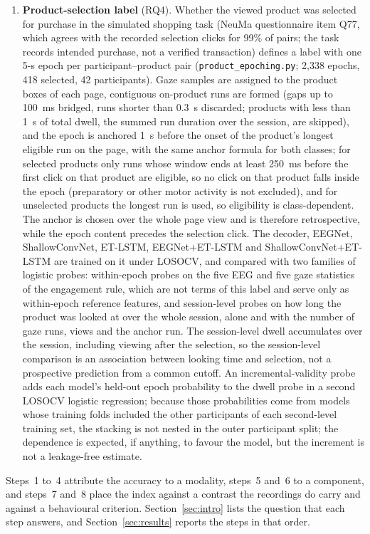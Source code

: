 \begin{enumerate}
\item \textbf{Product-selection label} (RQ4). Whether the viewed product was selected for purchase in the simulated shopping task (NeuMa questionnaire item Q77, which agrees with the recorded selection clicks for 99\% of pairs; the task records intended purchase, not a verified transaction) defines a label with one 5-s epoch per participant--product pair (\texttt{product\_epoching.py}; 2{,}338 epochs, 418 selected, 42 participants). Gaze samples are assigned to the product boxes of each page, contiguous on-product runs are formed (gaps up to 100~ms bridged, runs shorter than 0.3~s discarded; products with less than 1~s of total dwell, the summed run duration over the session, are skipped), and the epoch is anchored 1~s before the onset of the product's longest eligible run on the page, with the same anchor formula for both classes; for selected products only runs whose window ends at least 250~ms before the first click on that product are eligible, so no click on that product falls inside the epoch (preparatory or other motor activity is not excluded), and for unselected products the longest run is used, so eligibility is class-dependent. The anchor is chosen over the whole page view and is therefore retrospective, while the epoch content precedes the selection click. The decoder, EEGNet, ShallowConvNet, ET-LSTM, EEGNet+ET-LSTM and ShallowConvNet+ET-LSTM are trained on it under LOSOCV, and compared with two families of logistic probes: within-epoch probes on the five EEG and five gaze statistics of the engagement rule, which are not terms of this label and serve only as within-epoch reference features, and session-level probes on how long the product was looked at over the whole session, alone and with the number of gaze runs, views and the anchor run. The session-level dwell accumulates over the session, including viewing after the selection, so the session-level comparison is an association between looking time and selection, not a prospective prediction from a common cutoff. An incremental-validity probe adds each model's held-out epoch probability to the dwell probe in a second LOSOCV logistic regression; because those probabilities come from models whose training folds included the other participants of each second-level training set, the stacking is not nested in the outer participant split; the dependence is expected, if anything, to favour the model, but the increment is not a leakage-free estimate.
\end{enumerate}

Steps~1 to~4 attribute the accuracy to a modality, steps~5 and~6 to a component, and steps~7 and~8 place the index against a contrast the recordings do carry and against a behavioural criterion. Section~\ref{sec:intro} lists the question that each step answers, and Section~\ref{sec:results} reports the steps in that order.

